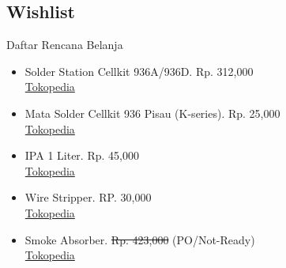 \documentclass[table,dvipsnames]{beamer}
\begin{document}
	\subsection{Wishlist}

	\begin{frame}
		\begin{exampleblock}{Daftar Rencana Belanja}
			\begin{itemize}
				\item Solder Station Cellkit 936A/936D. Rp. 312,000\\
				\href{https://www.tokopedia.com/ngemplakrejo/solder-station-cellkit-936-analog-ck-936a}{Tokopedia}

				\item Mata Solder Cellkit 936 Pisau (K-series). Rp. 25,000\\
				\href{https://www.tokopedia.com/cellkit/mata-solder-cellkit-936-model-pisau-miring-rohs-lead-free}{Tokopedia}

				\item IPA 1 Liter. Rp. 45,000\\
				\href{https://www.tokopedia.com/netafarmsurabaya/alkohol-ipa-isopropyl-alcohol-99-kemasan-1-liter}{Tokopedia}

				\item Wire Stripper. RP. 30,000\\
				\href{https://www.tokopedia.com/gudangperkakas18/tang-kupas-kabel-tang-potong-kabel-wire-stripper-7-inch-3-in-1}{Tokopedia}

				\item Smoke Absorber. \sout{Rp. 423,000} (PO/Not-Ready)\\
				\href{https://www.tokopedia.com/greenmall88/fa-400-solder-iron-smoke-absorber-fume-extractor-soldering-air-blower}{Tokopedia}
			\end{itemize}
		\end{exampleblock}
	\end{frame}
\end{document}
